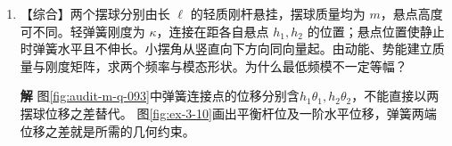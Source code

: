 \documentclass[11pt,openany,fontset=fandol]{ctexbook}
\theoremstyle{plain}\newtheorem{theorem}{定理}[chapter]\newtheorem{proposition}[theorem]{命题}
\theoremstyle{definition}\newtheorem{definition}{定义}[chapter]\newtheorem{example}{例}[chapter]
\theoremstyle{remark}\newtheorem*{remark}{说明}
\newcommand{\SolutionStart}{\par\nobreak\medskip\nobreak\noindent\textbf{解}\quad\ignorespaces}
\newenvironment{solution}{\SolutionStart}{\par\medskip}
\newcommand{\vct}[1]{\bm{#1}}\newcommand{\Rea}{\operatorname{Re}}\newcommand{\Ima}{\operatorname{Im}}
\begin{document}
\begin{enumerate}[label=3.\arabic*]
\begin{solution}
\begin{figure}[H]\centering
{}
\caption{题3.9解图：旋转后的第一基矢满足 $R\vct b_1=-\vct b_1+\vct b_2$，直接读出 $A'$ 的第一列 $(-1,1)^{\mathsf T}$。}\label{fig:ex-3-9}
\end{figure}

把 $(-1,1)$ 代回度量得到 $1-2+2=1$，与图中单位圆半径相同；按普通平方和却得到2。
\end{solution}

\item \begin{minipage}[t]{\linewidth}
【综合】两个摆球分别由长 $\ell$ 的轻质刚杆悬挂，摆球质量均为 $m$，悬点高度可不同。轻弹簧刚度为 $\kappa$，连接在距各自悬点 $h_1,h_2$ 的位置；悬点位置使静止时弹簧水平且不伸长。小摆角从竖直向下方向同向量起。由动能、势能建立质量与刚度矩阵，求两个频率与模态形状。为什么最低频模不一定等幅？

\end{minipage}

\begin{solution}
图\ref{fig:audit-m-q-093}中弹簧连接点的位移分别含$h_1\theta_1,h_2\theta_2$，不能直接以两摆球位移之差替代。
图\ref{fig:ex-3-10}画出平衡杆位及一阶水平位移，弹簧两端位移之差就是所需的几何约束。


\end{solution}
\end{enumerate}
\end{document}
